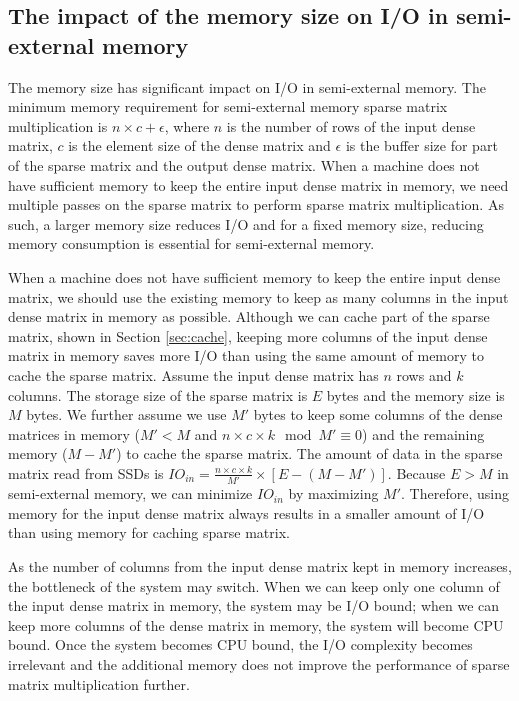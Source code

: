 \subsection{The impact of the memory size on I/O in semi-external memory}
\label{sec:mem}
The memory size has significant impact on I/O in semi-external memory.
The minimum memory requirement for semi-external memory sparse matrix
multiplication is $n \times c + \epsilon$, where $n$ is the number of rows
of the input dense matrix, $c$ is the element size of the dense matrix
and $\epsilon$ is the buffer size for part of the sparse matrix and the output
dense matrix. When a machine does not have sufficient memory to keep the entire
input dense matrix in memory, we need multiple passes on the sparse matrix to
perform sparse matrix multiplication. As such, a larger memory size reduces I/O
and for a fixed memory size, reducing memory consumption is
essential for semi-external memory.

When a machine does not have sufficient memory to keep the entire input dense
matrix, we should use the existing memory to keep as many columns
in the input dense matrix in memory as possible. Although
we can cache part of the sparse matrix, shown in Section \ref{sec:cache},
keeping more columns of the input dense matrix in memory saves more I/O than
using the same amount of memory to cache the sparse matrix. Assume the input
dense matrix has $n$ rows and $k$ columns. The storage size of the sparse
matrix is $E$ bytes and the memory size is $M$ bytes. We further assume
we use $M'$ bytes to keep some columns of the dense matrices in memory
($M' < M$ and ${n \times c \times k} \mod {M'} \equiv 0$)
and the remaining memory ($M - M'$) to cache the sparse matrix.
The amount of data in the sparse matrix read from SSDs is
$IO_{in} = \frac{n \times c \times k}{M'} \times [E - (M - M')]$.
Because $E > M$ in semi-external memory, we can minimize $IO_{in}$ by maximizing $M'$.
Therefore, using memory for the input dense matrix always results in a smaller
amount of I/O than using memory for caching sparse matrix.

As the number of columns from the input dense matrix kept in memory increases,
the bottleneck of the system
may switch. When we can keep only one column of the input dense matrix in memory,
the system may be I/O bound; when we can keep more columns of the dense matrix
in memory, the system will become CPU bound. Once the system becomes CPU bound,
the I/O complexity becomes irrelevant and the additional memory does not improve
the performance of sparse matrix multiplication further.

